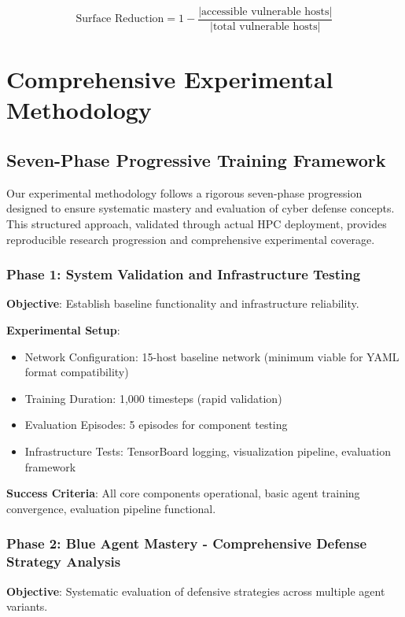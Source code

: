\documentclass[11pt]{article}
\newcounter{phase}[algorithm]
\theoremstyle{definition}
\theoremstyle{plain}
\begin{document}
\begin{equation}
\text{Surface Reduction} = 1 - \frac{|\text{accessible vulnerable hosts}|}{|\text{total vulnerable hosts}|}
\end{equation}

\section{Comprehensive Experimental Methodology}

\subsection{Seven-Phase Progressive Training Framework}

Our experimental methodology follows a rigorous seven-phase progression designed to ensure systematic mastery and evaluation of cyber defense concepts. This structured approach, validated through actual HPC deployment, provides reproducible research progression and comprehensive experimental coverage.

\subsubsection{Phase 1: System Validation and Infrastructure Testing}
\textbf{Objective}: Establish baseline functionality and infrastructure reliability.

\textbf{Experimental Setup}:
\begin{itemize}
\item Network Configuration: 15-host baseline network (minimum viable for YAML format compatibility)
\item Training Duration: 1,000 timesteps (rapid validation)
\item Evaluation Episodes: 5 episodes for component testing
\item Infrastructure Tests: TensorBoard logging, visualization pipeline, evaluation framework
\end{itemize}

\textbf{Success Criteria}: All core components operational, basic agent training convergence, evaluation pipeline functional.

\subsubsection{Phase 2: Blue Agent Mastery - Comprehensive Defense Strategy Analysis}
\textbf{Objective}: Systematic evaluation of defensive strategies across multiple agent variants.
\end{document}
